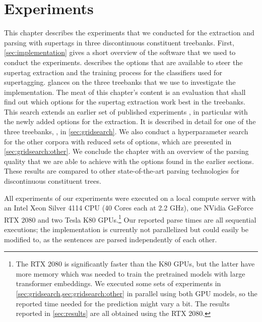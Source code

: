 \documentclass[../document.tex]{subfiles}
\begin{document}
    \chapter{Experiments}\label{sec:experiments}
    This chapter describes the experiments that we conducted for the extraction and parsing with supertags in three discontinuous constituent treebanks.
    First, \cref{sec:implementation} gives a short overview of the software that we used to conduct the experiments.
     describes the options that are available to steer the supertag extraction and the training process for the classifiers used for supertagging.
     glances on the three treebanks that we use to investigate the implementation.
    The meat of this chapter's content is an evaluation that shall find out which options for the supertag extraction work best in the treebanks.
    This search extends an earlier set of published experiments \citep{Rup22}, in particular with the newly added options for the extraction.
    It is described in detail for one of the three treebanks, \negra{}, in \cref{sec:gridsearch}.
    We also conduct a hyperparameter search for the other corpora with reduced sets of options, which are presented in \cref{sec:gridsearch:other}.
    We conclude the chapter with an overview of the parsing quality that we are able to achieve with the options found in the earlier sections.
    These results are compared to other state-of-the-art parsing technologies for discontinuous constituent trees.

    All experiments of our experiments were executed on a local compute server with an Intel Xeon Silver 4114 CPU (40 Cores each at 2.2 GHz), one NVidia GeForce RTX 2080 and two Tesla K80 GPUs.\footnote{
        The RTX 2080 is significantly faster than the K80 GPUs, but the latter have more memory which was needed to train the pretrained models with large transformer embeddings.
        We executed some sets of experiments in \cref{sec:gridsearch,sec:gridsearch:other} in parallel using both GPU models, so the reported time needed for the prediction might vary a bit.
        The results reported in \cref{sec:results} are all obtained using the RTX 2080. 
    }
    Our reported parse times are all sequential executions; the implementation is currently not parallelized but could easily be modified to, as the sentences are parsed independently of each other.
    
    
    
    
    
    
    

    \ifSubfilesClassLoaded{%
        \printindex
    }{}
\end{document}
